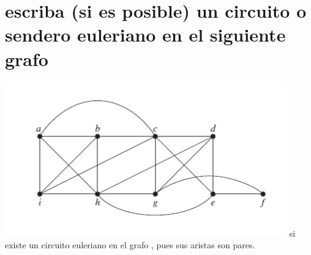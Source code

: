 \documentclass[10pt,a4paper]{article} %
\begin{document}
    \section{escriba (si es posible) un circuito o sendero euleriano en el
    siguiente grafo}
    \includegraphics[width=0.8\linewidth]{grafofinal.png}
    si existe un circuito euleriano en el grafo , pues sus aristas son pares.





















    \nocite{*}
    
    
\end{document}
